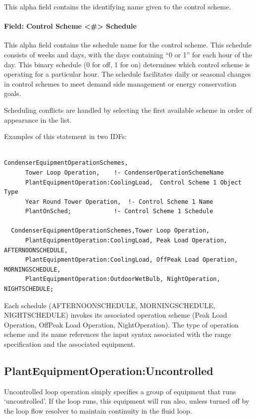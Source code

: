 This alpha field contains the identifying name given to the control scheme.

\paragraph{Field: Control Scheme \textless{}\#\textgreater{} Schedule}\label{field-control-scheme-schedule-1}

This alpha field contains the schedule name for the control scheme. This schedule consists of weeks and days, with the days containing ``0 or 1'' for each hour of the day. This binary schedule (0 for off, 1 for on) determines which control scheme is operating for a particular hour. The schedule facilitates daily or seasonal changes in control schemes to meet demand side management or energy conservation goals.

Scheduling conflicts are handled by selecting the first available scheme in order of appearance in the list.

Examples of this statement in two IDFs:

\begin{lstlisting}

CondenserEquipmentOperationSchemes,
      Tower Loop Operation,    !- CondenserOperationSchemeName
      PlantEquipmentOperation:CoolingLoad,  Control Scheme 1 Object Type
      Year Round Tower Operation,  !- Control Scheme 1 Name
      PlantOnSched;            !- Control Scheme 1 Schedule

  CondenserEquipmentOperationSchemes,Tower Loop Operation,
      PlantEquipmentOperation:CoolingLoad, Peak Load Operation, AFTERNOONSCHEDULE,
      PlantEquipmentOperation:CoolingLoad, OffPeak Load Operation, MORNINGSCHEDULE,
      PlantEquipmentOperation:OutdoorWetBulb, NightOperation, NIGHTSCHEDULE;
\end{lstlisting}

Each schedule (AFTERNOONSCHEDULE, MORNINGSCHEDULE, NIGHTSCHEDULE) invokes its associated operation scheme (Peak Load Operation, OffPeak Load Operation, NightOperation). The type of operation scheme and its name references the input syntax associated with the range specification and the associated equipment.

\subsection{PlantEquipmentOperation:Uncontrolled}\label{plantequipmentoperationuncontrolled}

Uncontrolled loop operation simply specifies a group of equipment that runs `uncontrolled'. If the loop runs, this equipment will run also, unless turned off by the loop flow resolver to maintain continuity in the fluid loop.

